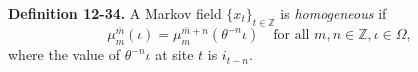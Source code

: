 \textbf{Definition 12-34.} A Markov field $\{x_t\}_{t \in \mathbb{Z}}$ is \textit{homogeneous} if
$$
\mu_m^{\bar{m}}(\iota) = \mu_m^{\bar{m}+n}(\theta^{-n}\iota) \quad \text{for all } m, n \in \mathbb{Z}, \iota \in \Omega,
$$
where the value of $\theta^{-n}\iota$ at site $t$ is $i_{t-n}$.

